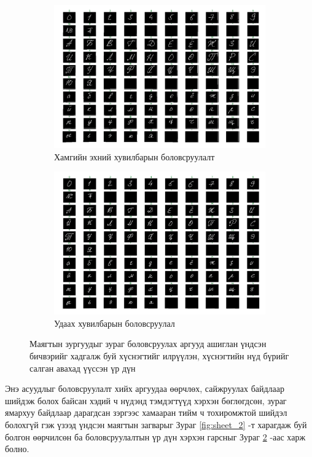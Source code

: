 \begin{figure}[H]
	\begin{subfigure}{0.5\textwidth}
		\includegraphics[width=0.9\linewidth]{images/sheet_1_segmented}
		\caption{Хамгийн эхний хувилбарын боловсруулалт}
		\label{fig:sheet_1_segmented}
	\end{subfigure}
	\begin{subfigure}{0.5\textwidth}
		\includegraphics[width=0.9\linewidth]{images/sheet_2_segmented}
		\caption{Удаах хувилбарын боловсруулал}
		\label{fig:sheet_2_segmented}
	\end{subfigure}
	\caption{Маягтын зургуудыг зураг боловсруулах аргууд ашиглан үндсэн бичвэрийг хадгалж буй хүснэгтийг илрүүлэн, хүснэгтийн нүд бүрийг салган авахад үүссэн үр дүн}
	\label{fig:sheets_cropped}
\end{figure}

Энэ асуудлыг боловсруулалт хийх аргуудаа өөрчлөх, сайжруулах байдлаар шийдэж болох байсан хэдий ч нүдэнд тэмдэгтүүд хэрхэн бөглөгдсөн, зураг ямархуу байдлаар дарагдсан зэргээс хамааран тийм ч тохиромжтой шийдэл болохгүй гэж үзээд үндсэн маягтын загварыг Зураг \ref{fig:sheet_2} -т харагдаж буй болгон өөрчилсөн ба боловсруулалтын үр дүн хэрхэн гарсныг Зураг \ref{fig:sheet_2_segmented} -аас харж болно.

